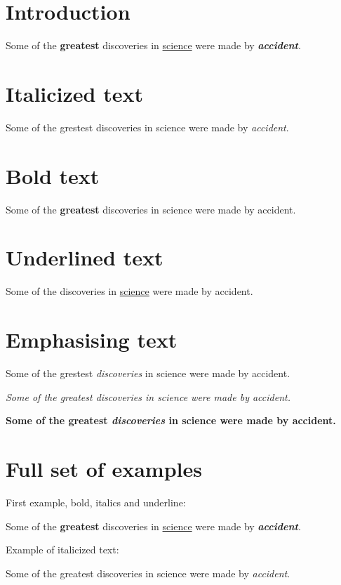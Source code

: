 \documentclass{article}
\begin{document}
 \section{Introduction}
  
   Some of the \textbf{greatest} discoveries in \underline{science} were made by \textbf{\textit{accident}}. 
 
 \section{Italicized text}
 Some of the grestest discoveries in science were made by \emph{accident}.
 
 \section{Bold text}
 Some of the \textbf{greatest} discoveries in science were made by accident.
   
 \section{Underlined text}
 Some of the discoveries in \underline{science} were made by accident. 
 
 \section{Emphasising text}
 Some of the grestest \emph{discoveries} in science were made by accident. 
 
 \textit{Some of the greatest \emph{discoveries} in science were made by accident.}
 
 \textbf{Some of the greatest \emph{discoveries} in science were made by accident.}
 
 \section{Full set of examples}
 First example, bold, italics and underline:


 Some of the \textbf{greatest} discoveries in \underline{science} were made by \textbf{\emph{accident}}.
 
 \vspace{1.5cm}
 
 Example of italicized text: 
 
 Some of the greatest discoveries in science were made by \emph{accident}.
 
 \vspace{1.5cm}
 
\end{document}
